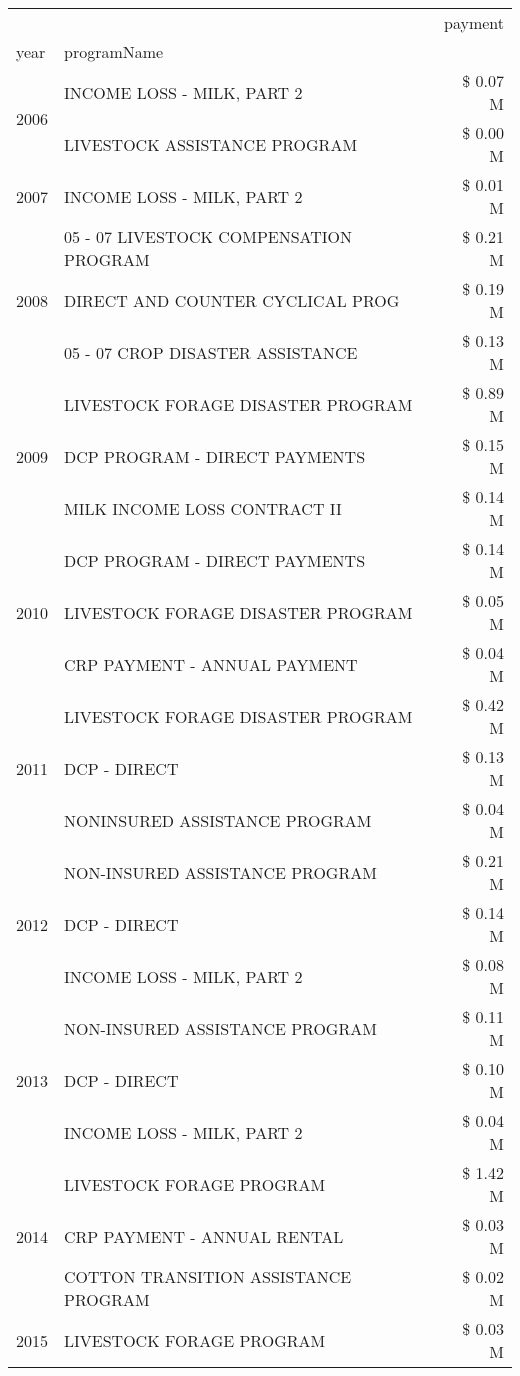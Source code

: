 \begin{tabular}{llr}
\toprule
 &  & payment \\
year & programName &  \\
\midrule
\multirow[t]{2}{*}{2006} & INCOME LOSS - MILK, PART 2 & \$ 0.07 M \\
 & LIVESTOCK ASSISTANCE PROGRAM & \$ 0.00 M \\
\cline{1-3}
2007 & INCOME LOSS - MILK, PART 2 & \$ 0.01 M \\
\cline{1-3}
\multirow[t]{3}{*}{2008} & 05 - 07 LIVESTOCK COMPENSATION PROGRAM & \$ 0.21 M \\
 & DIRECT AND COUNTER CYCLICAL PROG & \$ 0.19 M \\
 & 05 - 07 CROP DISASTER ASSISTANCE & \$ 0.13 M \\
\cline{1-3}
\multirow[t]{3}{*}{2009} & LIVESTOCK FORAGE DISASTER  PROGRAM & \$ 0.89 M \\
 & DCP PROGRAM - DIRECT PAYMENTS & \$ 0.15 M \\
 & MILK INCOME LOSS CONTRACT II & \$ 0.14 M \\
\cline{1-3}
\multirow[t]{3}{*}{2010} & DCP PROGRAM - DIRECT PAYMENTS & \$ 0.14 M \\
 & LIVESTOCK FORAGE DISASTER  PROGRAM & \$ 0.05 M \\
 & CRP PAYMENT - ANNUAL PAYMENT & \$ 0.04 M \\
\cline{1-3}
\multirow[t]{3}{*}{2011} & LIVESTOCK FORAGE DISASTER PROGRAM & \$ 0.42 M \\
 & DCP - DIRECT & \$ 0.13 M \\
 & NONINSURED ASSISTANCE PROGRAM & \$ 0.04 M \\
\cline{1-3}
\multirow[t]{3}{*}{2012} & NON-INSURED ASSISTANCE PROGRAM & \$ 0.21 M \\
 & DCP - DIRECT & \$ 0.14 M \\
 & INCOME LOSS - MILK, PART 2 & \$ 0.08 M \\
\cline{1-3}
\multirow[t]{3}{*}{2013} & NON-INSURED ASSISTANCE PROGRAM & \$ 0.11 M \\
 & DCP - DIRECT & \$ 0.10 M \\
 & INCOME LOSS - MILK, PART 2 & \$ 0.04 M \\
\cline{1-3}
\multirow[t]{3}{*}{2014} & LIVESTOCK FORAGE PROGRAM & \$ 1.42 M \\
 & CRP PAYMENT - ANNUAL RENTAL & \$ 0.03 M \\
 & COTTON TRANSITION ASSISTANCE PROGRAM & \$ 0.02 M \\
\cline{1-3}
\multirow[t]{3}{*}{2015} & LIVESTOCK FORAGE PROGRAM & \$ 0.03 M \\

\end{tabular}
